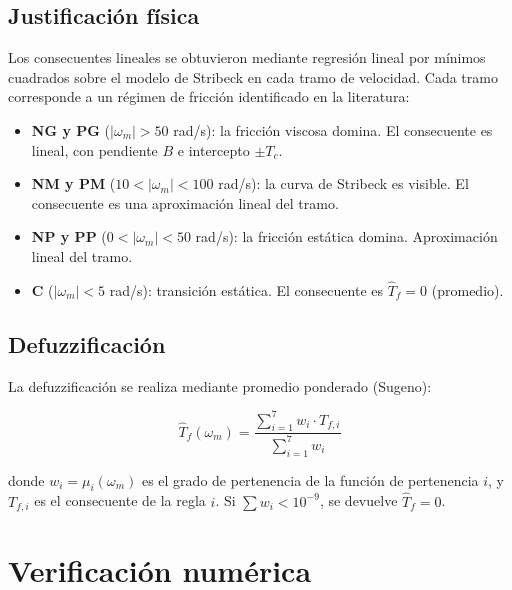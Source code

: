 \subsection{Justificación física}
\label{subsec:cap5_justificacion}

Los consecuentes lineales se obtuvieron mediante regresión lineal por mínimos cuadrados sobre el modelo de Stribeck en cada tramo de velocidad. Cada tramo corresponde a un régimen de fricción identificado en la literatura:

\begin{itemize}
  \item \textbf{NG y PG} ($|\omega_m| > 50$ rad/s): la fricción viscosa domina. El consecuente es lineal, con pendiente $B$ e intercepto $\pm T_c$.
  
  \item \textbf{NM y PM} ($10 < |\omega_m| < 100$ rad/s): la curva de Stribeck es visible. El consecuente es una aproximación lineal del tramo.
  
  \item \textbf{NP y PP} ($0 < |\omega_m| < 50$ rad/s): la fricción estática domina. Aproximación lineal del tramo.
  
  \item \textbf{C} ($|\omega_m| < 5$ rad/s): transición estática. El consecuente es $\hat{T}_f = 0$ (promedio).
\end{itemize}

\subsection{Defuzzificación}
\label{subsec:cap5_defuzz}

La defuzzificación se realiza mediante promedio ponderado (Sugeno):

\begin{equation}
\hat{T}_f(\omega_m) = \frac{\sum_{i=1}^{7} w_i \cdot T_{f,i}}{\sum_{i=1}^{7} w_i}
\label{eq:cap5_defuzz}
\end{equation}

donde $w_i = \mu_i(\omega_m)$ es el grado de pertenencia de la función de pertenencia $i$, y $T_{f,i}$ es el consecuente de la regla $i$. Si $\sum w_i < 10^{-9}$, se devuelve $\hat{T}_f = 0$.


\section{Verificación numérica}
\label{sec:cap5_verificacion}

